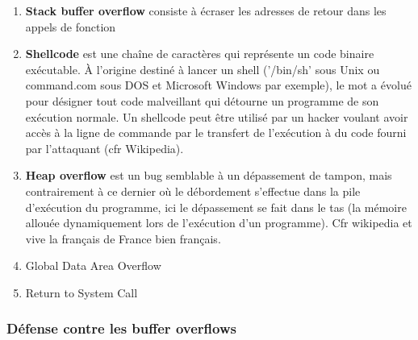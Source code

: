 \documentclass{report}
\begin{document}
\begin{enumerate}
    \item \textbf{Stack buffer overflow} consiste à écraser les adresses de retour dans les appels de fonction

    \item \textbf{Shellcode} est une chaîne de caractères qui représente un code binaire exécutable. À l'origine destiné à lancer un shell ('/bin/sh' sous Unix ou command.com sous DOS et Microsoft Windows par exemple), le mot a évolué pour désigner tout code malveillant qui détourne un programme de son exécution normale. Un shellcode peut être utilisé par un hacker voulant avoir accès à la ligne de commande par le transfert de l'exécution à du code fourni par l'attaquant (cfr Wikipedia).

    \item \textbf{Heap overflow} est un bug semblable à un dépassement de tampon, mais contrairement à ce dernier où le débordement s'effectue dans la pile d'exécution du programme, ici le dépassement se fait dans le tas (la mémoire allouée dynamiquement lors de l'exécution d'un programme). Cfr wikipedia et vive la français de France bien français.

    \item Global Data Area Overflow
    \item Return to System Call
\end{enumerate}

\subsubsection{Défense contre les buffer overflows}
\end{document}
